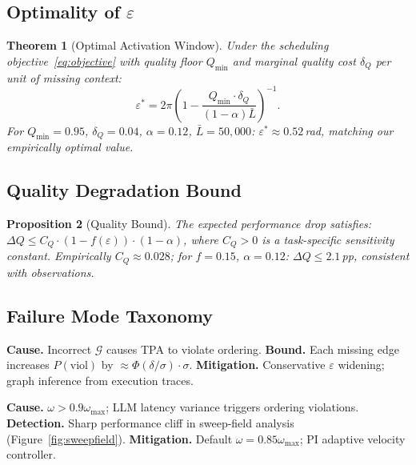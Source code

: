 \documentclass[10pt,twocolumn]{article}
\theoremstyle{plain}
\newtheorem{theorem}{Theorem}[section]
\newtheorem{proposition}[theorem]{Proposition}
\theoremstyle{definition}
\theoremstyle{remark}
\newcommand{\G}{\mathcal{G}}
\newcommand{\eps}{\varepsilon}
\newcommand{\sweepvel}{\omega}
\begin{document}
\subsection{Optimality of \texorpdfstring{$\eps$}{epsilon}}

\begin{theorem}[Optimal Activation Window]
\label{thm:optimal}
Under the scheduling objective~\eqref{eq:objective} with quality floor
$Q_{\min}$ and marginal quality cost $\delta_Q$ per unit of missing
context:
\[
  \eps^* = 2\pi\left(1 - \frac{Q_{\min}\cdot\delta_Q}{(1-\alpha)\bar{L}}\right)^{-1}.
\]
For $Q_{\min}=0.95$, $\delta_Q=0.04$, $\alpha=0.12$,
$\bar{L}=50{,}000$: $\eps^*\approx 0.52$\,rad,
matching our empirically optimal value.
\end{theorem}

\subsection{Quality Degradation Bound}

\begin{proposition}[Quality Bound]
\label{prop:quality}
The expected performance drop satisfies:
$\Delta Q \leq C_Q\cdot(1-f(\eps))\cdot(1-\alpha)$,
where $C_Q>0$ is a task-specific sensitivity constant.
Empirically $C_Q\approx0.028$; for $f=0.15$, $\alpha=0.12$:
$\Delta Q\leq 2.1$\,pp, consistent with observations.
\end{proposition}

\subsection{Failure Mode Taxonomy}

\begin{tcolorbox}[failmode={F1 --- Phase Misalignment}]
\textbf{Cause.} Incorrect $\G$ causes TPA to violate ordering.
\textbf{Bound.} Each missing edge increases $P(\mathrm{viol})$ by
$\approx\Phi(\delta/\sigma)\cdot\sigma$.
\textbf{Mitigation.} Conservative $\eps$ widening; graph inference
from execution traces.
\end{tcolorbox}

\begin{tcolorbox}[failmode={F2 --- Velocity Overshoot}]
\textbf{Cause.} $\sweepvel>0.9\sweepvel_{\max}$; LLM latency variance
triggers ordering violations.
\textbf{Detection.} Sharp performance cliff in sweep-field analysis
(Figure~\ref{fig:sweepfield}).
\textbf{Mitigation.} Default $\sweepvel=0.85\sweepvel_{\max}$;
PI adaptive velocity controller.
\end{tcolorbox}
\end{document}
